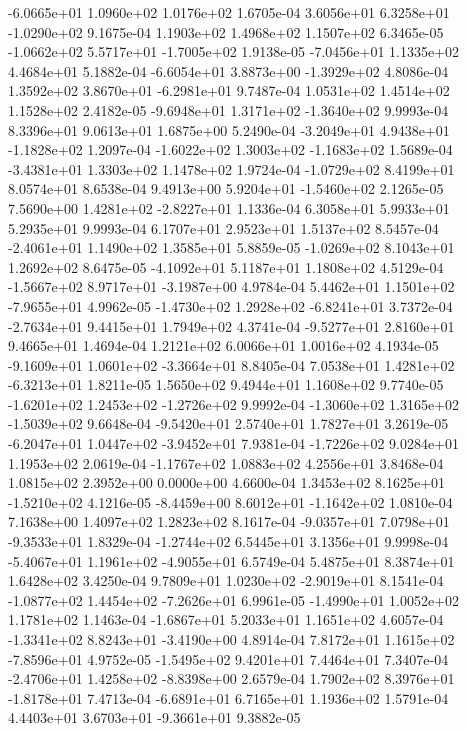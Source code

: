 -6.0665e+01  1.0960e+02  1.0176e+02  1.6705e-04
 3.6056e+01  6.3258e+01 -1.0290e+02  9.1675e-04
1.1903e+02 1.4968e+02 1.1507e+02  6.3465e-05
-1.0662e+02  5.5717e+01 -1.7005e+02  1.9138e-05
-7.0456e+01  1.1335e+02  4.4684e+01  5.1882e-04
-6.6054e+01  3.8873e+00 -1.3929e+02  4.8086e-04
 1.3592e+02  3.8670e+01 -6.2981e+01  9.7487e-04
1.0531e+02 1.4514e+02 1.1528e+02  2.4182e-05
-9.6948e+01  1.3171e+02 -1.3640e+02  9.9993e-04
8.3396e+01 9.0613e+01 1.6875e+00  5.2490e-04
-3.2049e+01  4.9438e+01 -1.1828e+02  1.2097e-04
-1.6022e+02  1.3003e+02 -1.1683e+02  1.5689e-04
-3.4381e+01  1.3303e+02  1.1478e+02  1.9724e-04
-1.0729e+02  8.4199e+01  8.0574e+01  8.6538e-04
 9.4913e+00  5.9204e+01 -1.5460e+02  2.1265e-05
 7.5690e+00  1.4281e+02 -2.8227e+01  1.1336e-04
6.3058e+01 5.9933e+01 5.2935e+01  9.9993e-04
6.1707e+01 2.9523e+01 1.5137e+02  8.5457e-04
-2.4061e+01  1.1490e+02  1.3585e+01  5.8859e-05
-1.0269e+02  8.1043e+01  1.2692e+02  8.6475e-05
-4.1092e+01  5.1187e+01  1.1808e+02  4.5129e-04
-1.5667e+02  8.9717e+01 -3.1987e+00  4.9784e-04
 5.4462e+01  1.1501e+02 -7.9655e+01  4.9962e-05
-1.4730e+02  1.2928e+02 -6.8241e+01  3.7372e-04
-2.7634e+01  9.4415e+01  1.7949e+02  4.3741e-04
-9.5277e+01  2.8160e+01  9.4665e+01  1.4694e-04
1.2121e+02 6.0066e+01 1.0016e+02  4.1934e-05
-9.1609e+01  1.0601e+02 -3.3664e+01  8.8405e-04
 7.0538e+01  1.4281e+02 -6.3213e+01  1.8211e-05
1.5650e+02 9.4944e+01 1.1608e+02  9.7740e-05
-1.6201e+02  1.2453e+02 -1.2726e+02  9.9992e-04
-1.3060e+02  1.3165e+02 -1.5039e+02  9.6648e-04
-9.5420e+01  2.5740e+01  1.7827e+01  3.2619e-05
-6.2047e+01  1.0447e+02 -3.9452e+01  7.9381e-04
-1.7226e+02  9.0284e+01  1.1953e+02  2.0619e-04
-1.1767e+02  1.0883e+02  4.2556e+01  3.8468e-04
1.0815e+02 2.3952e+00 0.0000e+00  4.6600e-04
 1.3453e+02  8.1625e+01 -1.5210e+02  4.1216e-05
-8.4459e+00  8.6012e+01 -1.1642e+02  1.0810e-04
7.1638e+00 1.4097e+02 1.2823e+02  8.1617e-04
-9.0357e+01  7.0798e+01 -9.3533e+01  1.8329e-04
-1.2744e+02  6.5445e+01  3.1356e+01  9.9998e-04
-5.4067e+01  1.1961e+02 -4.9055e+01  6.5749e-04
5.4875e+01 8.3874e+01 1.6428e+02  3.4250e-04
 9.7809e+01  1.0230e+02 -2.9019e+01  8.1541e-04
-1.0877e+02  1.4454e+02 -7.2626e+01  6.9961e-05
-1.4990e+01  1.0052e+02  1.1781e+02  1.1463e-04
-1.6867e+01  5.2033e+01  1.1651e+02  4.6057e-04
-1.3341e+02  8.8243e+01 -3.4190e+00  4.8914e-04
 7.8172e+01  1.1615e+02 -7.8596e+01  4.9752e-05
-1.5495e+02  9.4201e+01  7.4464e+01  7.3407e-04
-2.4706e+01  1.4258e+02 -8.8398e+00  2.6579e-04
 1.7902e+02  8.3976e+01 -1.8178e+01  7.4713e-04
-6.6891e+01  6.7165e+01  1.1936e+02  1.5791e-04
 4.4403e+01  3.6703e+01 -9.3661e+01  9.3882e-05
